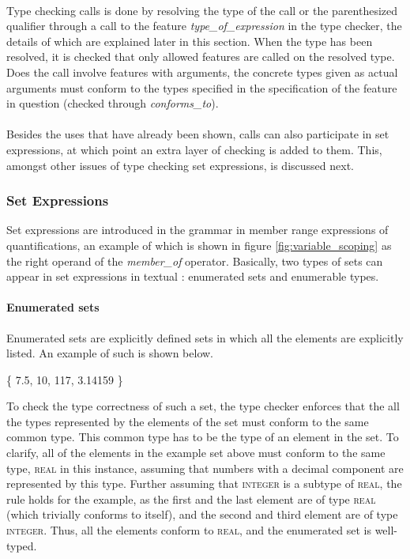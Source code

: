 \paragraph{}
Type checking calls is done by resolving the type of the call or the parenthesized qualifier through a call to the feature \textit{type\_of\_expression} in the type checker, the details of which are explained later in this section. When the type has been resolved, it is checked that only allowed features are called on the resolved type. Does the call involve features with arguments, the concrete types given as actual arguments must conform to the types specified in the specification of the feature in question (checked through \textit{conforms\_to}).
\paragraph{}
Besides the uses that have already been shown, calls can also participate in set expressions, at which point an extra layer of checking is added to them. This, amongst other issues of type checking set expressions, is discussed next.
\subsubsection{Set Expressions}
\label{implementation-set-expressions}
Set expressions are introduced in the grammar in member range expressions of quantifications, an example of which is shown in figure \ref{fig:variable_scoping} as the right operand of the \textit{member\_of} operator. Basically, two types of sets can appear in set expressions in textual \bon{}: enumerated sets and enumerable types.
\paragraph{Enumerated sets}
Enumerated sets are explicitly defined sets in which all the elements are explicitly listed. An example of such is shown below.
{\footnotesize
\begin{center}
\{ 7.5,  10, 117, 3.14159 \}	
\end{center}}
To check the type correctness of such a set, the type checker enforces that the all the types represented by the elements of the set must conform to the same common type. This common type has to be the type of an element in the set. To clarify, all of the elements in the example set above must conform to the same type, \textsc{real} in this instance, assuming that numbers with a decimal component are represented by this type. Further assuming that \textsc{integer} is a subtype of \textsc{real}, the rule holds for the example, as the first and the last element are of type \textsc{real} (which trivially conforms to itself), and the second and third element are of type \textsc{integer}. Thus, all the elements conform to \textsc{real}, and the enumerated set is well-typed.


